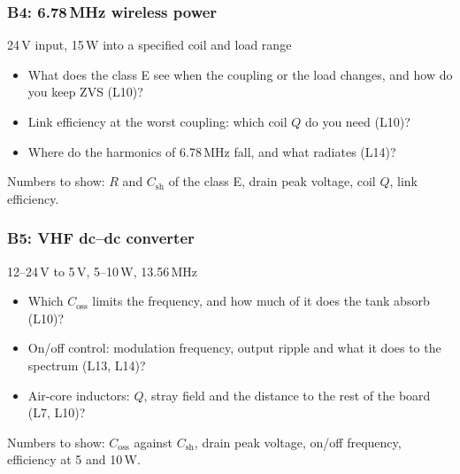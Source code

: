 \begin{frame}
	\frametitle{B4: 6.78\,MHz wireless power}
	\begin{varblock}[\textwidth]{24\,V input, 15\,W into a specified coil and load range}
		\begin{itemize}
			\item What does the class E see when the coupling or the load changes, and how do you keep ZVS (L10)?
			\item Link efficiency at the worst coupling: which coil $Q$ do you need (L10)?
			\item Where do the harmonics of 6.78\,MHz fall, and what radiates (L14)?
		\end{itemize}
	\end{varblock}
	\small
	Numbers to show: $R$ and $C_\mathrm{sh}$ of the class E, drain peak voltage, coil $Q$, link efficiency.
\end{frame}

\begin{frame}
	\frametitle{B5: VHF dc--dc converter}
	\begin{varblock}[\textwidth]{12--24\,V to 5\,V, 5--10\,W, 13.56\,MHz}
		\begin{itemize}
			\item Which $C_\mathrm{oss}$ limits the frequency, and how much of it does the tank absorb (L10)?
			\item On/off control: modulation frequency, output ripple and what it does to the spectrum (L13, L14)?
			\item Air-core inductors: $Q$, stray field and the distance to the rest of the board (L7, L10)?
		\end{itemize}
	\end{varblock}
	\small
	Numbers to show: $C_\mathrm{oss}$ against $C_\mathrm{sh}$, drain peak voltage, on/off frequency, efficiency at 5 and 10\,W.
\end{frame}

